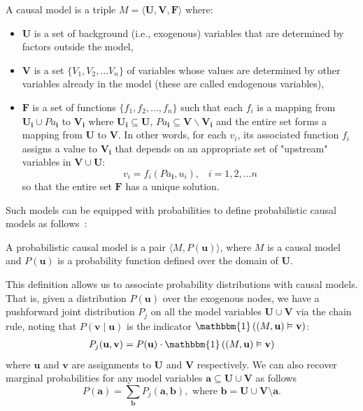 \documentclass[anon,12pt]{clear2025} %
\begin{document}
\begin{definition}
    A causal model is a triple \(M = \langle \mathbf{U}, \mathbf{V}, \mathbf{F} \rangle\) where:
\begin{itemize}
    \item $\mathbf{U}$ is a set of background (i.e., exogenous) variables  that are determined by factors outside the model,
    \item $\mathbf{V}$ is a set \(\{V_1, V_2, \ldots V_n\}\) of  variables whose values are determined by other variables already in the model (these are called endogenous variables),
    \item $\mathbf{F}$ is a set of functions \(\{f_1, f_2, \ldots, f_n\}\) such that each \(f_i\) is a mapping from \(\mathbf{U_i} \cup \mathbf{\mathit{Pa}_i}\) to \(\mathbf{V_i}\) where \(\mathbf{U_i} \subseteq \mathbf{U}\), \(\mathbf{\mathit{Pa}_i} \subseteq \mathbf{V} \backslash \mathbf{V_i}\) and the entire set forms a mapping from $\mathbf{U}$ to $\mathbf{V}$. In other words, for each $v_i$, its associated function  \(f_i\) 
    assigns a value to \(\mathbf{V_i}\) that depends on an appropriate set of "upstream" variables in \(\mathbf{V} \cup \mathbf{U}\): \[v_i = f_i(\mathbf{\mathit{Pa}_i}, u_i), \;\;\; i = 1, 2, \ldots n\]
    so that the entire set \(\mathbf{F}\) has a unique solution.
\end{itemize}
\end{definition}

\noindent Such models can be  equipped with probabilities to define probabilistic causal models as follows~\cite{causalityPearl}:
\begin{definition}
    A probabilistic causal model is a pair \(\langle M, P(\mathbf{u}) \rangle\), where \(M\) is a causal model and \(P(\mathbf{u})\) is a probability function defined over the domain of \(\mathbf{U}\).
\end{definition}

This definition allows us to associate probability distributions with causal models. That is, given a distribution $P(\mathbf{u})$ over the exogenous nodes, we have a pushforward joint distribution \(P_j\) on all the model variables \(\mathbf{U} \cup \mathbf{V}\) via the chain rule, noting that $P(\mathbf{v} \mid  \mathbf{u})$ is the indicator $\mathbbm{1}\left ( (M, \mathbf{u}) \vDash \mathbf{v}\right)$:
\begin{align} \label{eq:joint} P_j(\mathbf{u}, \mathbf{v}) = P(\mathbf{u}) \cdot \mathbbm{1}\left ( (M, \mathbf{u}) \vDash \mathbf{v}\right)\end{align}
where \(\mathbf{u}\) and \(\mathbf{v}\) are assignments to \(\mathbf{U}\) and \(\mathbf{V}\) respectively. We can also recover marginal probabilities for any model variables $\mathbf{a} \subseteq \mathbf{U}\cup \mathbf{V}$ as follows
\[
P(\mathbf{a}) = \sum_{\mathbf{b}} P_j(\mathbf{a}, \mathbf{b}), \mbox{  where } \mathbf{b} = \mathbf{U}\cup \mathbf{V} \setminus \mathbf{a}.
\]
\end{document}
